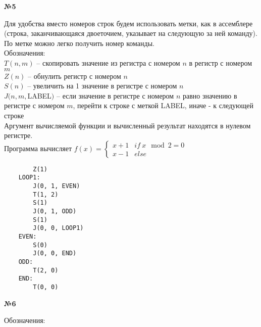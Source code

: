 \documentclass{article}
\newenvironment{task}{\begin{center}\fontsize{14}{14}\selectfont\bf}{\rm\fontsize{12}{12}\selectfont\end{center}}
\begin{document}
	
	
	
			
	\begin{task} 
		№5
	\end{task}

	Для удобства вместо номеров строк будем использовать метки, как в ассемблере (строка, заканчивающаяся двоеточием, указывает на следующую за ней команду). По метке можно легко получить номер команды.\\
	Обозначения:\\
	
	\hspace{30px}	$T(n, m)$ -- скопировать значение из регистра с номером $n$ в регистр с номером $m$ \\
		
	\hspace{30px}	$Z(n)$ -- обнулить регистр с номером $n$ \\
		
	\hspace{30px}	$S(n)$ -- увеличить на 1 значение в регистре с номером $n$ \\
		
	\hspace{30px}	$J(n, m, $LABEL$)$ -- если значение в регистре с номером $n$ равно значению в регистре с номером $m$, перейти
	\hspace{30px} к строке с меткой LABEL, иначе - к следующей строке \\
		
	\hspace{30px}	Аргумент вычисляемой функции и вычисленный результат находятся в нулевом регистре.\\
	Программа вычисляет $f(x) = \begin{cases}
	x + 1 & if \ x \mod 2 = 0 \\
	x - 1 & else
	\end{cases}$
	\begin{lstlisting}
		Z(1)
	LOOP1:
		J(0, 1, EVEN)
		T(1, 2)
		S(1)
		J(0, 1, ODD)
		S(1)
		J(0, 0, LOOP1)
	EVEN:
		S(0)
		J(0, 0, END)
	ODD:
		T(2, 0)
	END:
		T(0, 0)
	\end{lstlisting}




	\begin{task} 
		№6
	\end{task}
	Обозначения:\\
	
\end{document}
